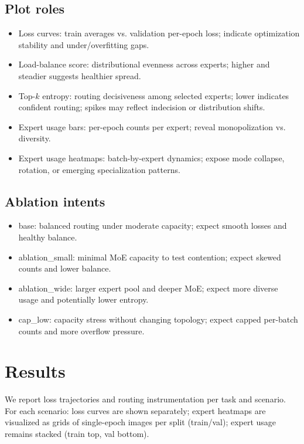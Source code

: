 \documentclass[11pt,a4paper]{article}
\begin{document}
\subsection{Plot roles}
\begin{itemize}[leftmargin=*]
  \item Loss curves: train averages vs. validation per-epoch loss; indicate optimization stability and under/overfitting gaps.
  \item Load-balance score: distributional evenness across experts; higher and steadier suggests healthier spread.
  \item Top-$k$ entropy: routing decisiveness among selected experts; lower indicates confident routing; spikes may reflect indecision or distribution shifts.
  \item Expert usage bars: per-epoch counts per expert; reveal monopolization vs. diversity.
  \item Expert usage heatmaps: batch-by-expert dynamics; expose mode collapse, rotation, or emerging specialization patterns.
\end{itemize}

\subsection{Ablation intents}
\begin{itemize}[leftmargin=*]
  \item base: balanced routing under moderate capacity; expect smooth losses and healthy balance.
  \item ablation\_small: minimal MoE capacity to test contention; expect skewed counts and lower balance.
  \item ablation\_wide: larger expert pool and deeper MoE; expect more diverse usage and potentially lower entropy.
  \item cap\_low: capacity stress without changing topology; expect capped per-batch counts and more overflow pressure.
\end{itemize}

\section{Results}
We report loss trajectories and routing instrumentation per task and scenario. For each scenario: loss curves are shown separately; expert heatmaps are visualized as grids of single-epoch images per split (train/val); expert usage remains stacked (train top, val bottom).
\end{document}

